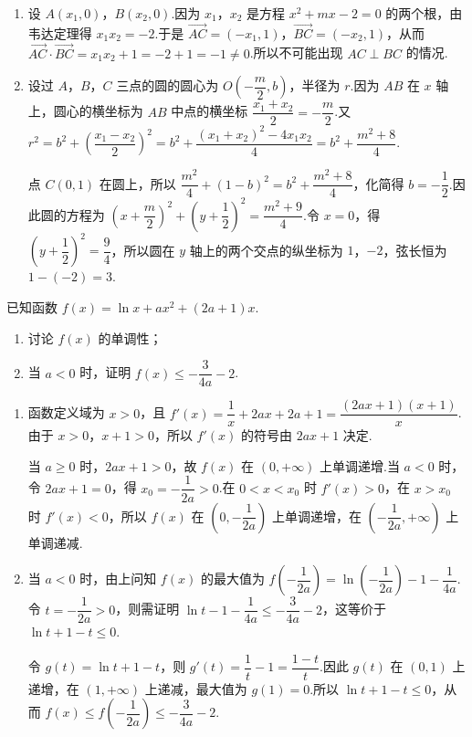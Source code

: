\begin{solution}
\begin{enumerate}
\item 设 \(A(x_1,0)\)，\(B(x_2,0)\).因为 \(x_1\)，\(x_2\) 是方程 \(x^2+mx-2=0\) 的两个根，由韦达定理得 \(x_1x_2=-2\).于是
\(\overrightarrow{AC}=(-x_1,1)\)，\(\overrightarrow{BC}=(-x_2,1)\)，从而
\(\overrightarrow{AC}\cdot\overrightarrow{BC}=x_1x_2+1=-2+1=-1\ne0\).所以不可能出现 \(AC\perp BC\) 的情况.
\item 设过 \(A\)，\(B\)，\(C\) 三点的圆的圆心为 \(O\left(-\dfrac m2,b\right)\)，半径为 \(r\).因为 \(AB\) 在 \(x\) 轴上，圆心的横坐标为 \(AB\) 中点的横坐标 \(\dfrac{x_1+x_2}{2}=-\dfrac m2\).又
\(r^2=b^2+\left(\dfrac{x_1-x_2}{2}\right)^2=b^2+\dfrac{(x_1+x_2)^2-4x_1x_2}{4}=b^2+\dfrac{m^2+8}{4}\).

点 \(C(0,1)\) 在圆上，所以
\(\dfrac{m^2}{4}+(1-b)^2=b^2+\dfrac{m^2+8}{4}\)，化简得 \(b=-\dfrac12\).因此圆的方程为
\(\left(x+\dfrac m2\right)^2+\left(y+\dfrac12\right)^2=\dfrac{m^2+9}{4}\).令 \(x=0\)，得 \(\left(y+\dfrac12\right)^2=\dfrac94\)，所以圆在 \(y\) 轴上的两个交点的纵坐标为 \(1\)，\(-2\)，弦长恒为 \(1-(-2)=3\).
\end{enumerate}
\end{solution}

\begin{problem}
已知函数 \(f(x)=\ln x+ax^2+(2a+1)x\).

\begin{enumerate}
\item 讨论 \(f(x)\) 的单调性；
\item 当 \(a<0\) 时，证明 \(f(x)\le -\dfrac{3}{4a}-2\).
\end{enumerate}
\end{problem}

\begin{solution}
\begin{enumerate}
\item 函数定义域为 \(x>0\)，且
\(f'(x)=\dfrac1x+2ax+2a+1=\dfrac{(2ax+1)(x+1)}{x}\).由于 \(x>0\)，\(x+1>0\)，所以 \(f'(x)\) 的符号由 \(2ax+1\) 决定.

当 \(a\geq0\) 时，\(2ax+1>0\)，故 \(f(x)\) 在 \((0,+\infty)\) 上单调递增.当 \(a<0\) 时，令 \(2ax+1=0\)，得 \(x_0=-\dfrac{1}{2a}>0\).在 \(0<x<x_0\) 时 \(f'(x)>0\)，在 \(x>x_0\) 时 \(f'(x)<0\)，所以 \(f(x)\) 在 \(\left(0,-\dfrac{1}{2a}\right)\) 上单调递增，在 \(\left(-\dfrac{1}{2a},+\infty\right)\) 上单调递减.
\item 当 \(a<0\) 时，由上问知 \(f(x)\) 的最大值为
\(f\left(-\dfrac{1}{2a}\right)=\ln\left(-\dfrac{1}{2a}\right)-1-\dfrac{1}{4a}\).令 \(t=-\dfrac{1}{2a}>0\)，则需证明
\(\ln t-1-\dfrac{1}{4a}\leq-\dfrac{3}{4a}-2\)，这等价于 \(\ln t+1-t\leq0\).

令 \(g(t)=\ln t+1-t\)，则 \(g'(t)=\dfrac1t-1=\dfrac{1-t}{t}\).因此 \(g(t)\) 在 \((0,1)\) 上递增，在 \((1,+\infty)\) 上递减，最大值为 \(g(1)=0\).所以 \(\ln t+1-t\leq0\)，从而
\(f(x)\leq f\left(-\dfrac{1}{2a}\right)\leq-\dfrac{3}{4a}-2\).
\end{enumerate}
\end{solution}

